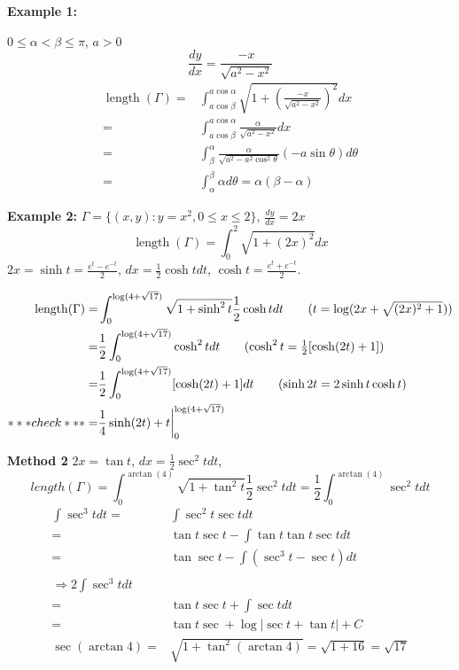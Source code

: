 \documentclass[12pt]{article}
\theoremstyle{plain}
\newcommand{\abs}[1]{\left| #1 \right|}
\DeclareMathOperator{\Length}{length}
\begin{document}
{\color{Brown}
	\textbf{Example 1:}
	
	$0\leq \alpha<\beta\leq \pi$, $a > 0$ 
	\[
		\frac{dy}{dx} = \frac{-x}{\sqrt{a^2-x^2}}
	\]
	\begin{align*}
		\Length(\Gamma) 
		=&\int_{a\cos \beta}^{a\cos \alpha} 
		\sqrt{1+(\frac{-x}{\sqrt{a^2-x^2}})^2}dx\\
		=& \int_{a\cos \beta}^{a\cos \alpha} 
		\frac{\alpha}{\sqrt{a^2-x^2}} dx\\
		=& \int_{\beta}^{\alpha} 
		\frac{\alpha}{\sqrt{a^2-a^2\cos^2\theta}}(-a\sin\theta)d\theta\\
		=&\int_{\alpha}^{\beta} \alpha d\theta
		= \alpha(\beta - \alpha)
	\end{align*}
	
	\textbf{Example 2: }
	$\Gamma = \{(x,y):y = x^2, 0\leq x\leq 2\}$, $\frac{dy}{dx} = 2x$
	\[
		\Length(\Gamma)= \int_0^2 \sqrt{1+(2x)^2}dx
	\]
	$2x = \sinh t = \frac{e^t-e^{-t}}2$, $dx = \frac12\cosh t dt$,
	$\cosh t = \frac{e^t+e^{-t}}2$. 
	
	\begin{align*}
		\Length(\Gamma) 
		=& \int_0^{\log(4+\sqrt{17})} \sqrt{1+\sinh^2 t} \frac 12
		\cosh t dt 
		\tag{$t = \log(2x+\sqrt{(2x)^2+1})$}\\
		=& \frac 12 \int_0^{\log(4+\sqrt{17})} \cosh^2 t dt
		\tag{$\cosh^2 t = \frac 12 [\cosh (2t) + 1]$}\\
		=& \frac12 \int_0^{\log(4+\sqrt{17})} [\cosh(2t) + 1]dt
		\tag{$\sinh 2t= 2 \sinh t \cosh t$}\\
		***check***=& \frac 14 \sinh(2t) + 
		t\bigg\vert_0^{\log(4+\sqrt{17})}
	\end{align*}

	\textbf{Method 2}
	$2x = \tan t$, $dx = \frac 12 \sec^2 t dt$, 
	\[
		length(\Gamma) = \int_0^{\arctan(4)} \sqrt{1+\tan^2 t}
		\frac 12 \sec^2 t dt = \frac 12 \int_0^{\arctan (4)}\sec^2 t dt
	\]
	\begin{align*}
		\int \sec^3 t dt 
		=& \int \sec^2 t \sec t dt\\
		=& \tan t \sec t - \int \tan t \tan t\sec t dt\\
		=& \tan \sec t - \int (\sec^3 t - \sec t)dt\\\\
		\Rightarrow 2 \int \sec^3 t dt \\
		=& \tan t \sec t + \int \sec tdt \\
		=& \tan t \sec + \log\abs{\sec t + \tan t} + C\\
		\sec(\arctan 4) =& \sqrt{1+\tan^2(\arctan 4)} = \sqrt{1+16} = \sqrt{17}
	\end{align*}
}
\end{document}
